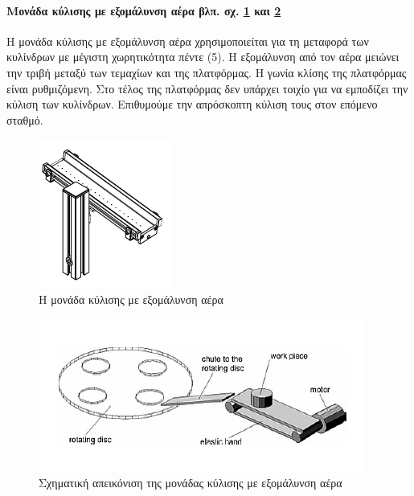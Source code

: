 \documentclass[a4paper,12pt,twoside]{report}
\begin{document}
{				\paragraph{Μονάδα κύλισης με εξομάλυνση αέρα {\footnotesize βλπ. σχ. \ref{φωτ:Η μονάδα κύλισης με εξομάλυνση αέρα από Festo} και \ref{φωτ:Σχηματική απεικόνιση της μονάδας κύλισης με εξομάλυνση αέρα από Θράμπο}}} {Η μονάδα κύλισης με εξομάλυνση αέρα χρησιμοποιείται για τη μεταφορά των κυλίνδρων με μέγιστη χωρητικότητα πέντε (5). Η εξομάλυνση από τον αέρα μειώνει την τριβή μεταξύ των τεμαχίων και της πλατφόρμας. Η γωνία κλίσης της πλατφόρμας είναι ρυθμιζόμενη. Στο τέλος της πλατφόρμας δεν υπάρχει τοιχίο για να εμποδίζει την κύλιση των κυλίνδρων. Επιθυμούμε την απρόσκοπτη κύλιση τους στον επόμενο σταθμό.
				}
				\begin{figure}[hp]
					\centering
					\includegraphics[scale=1]{TestingStationAirCushionedSlideModule.png}
					\caption{Η μονάδα κύλισης με εξομάλυνση αέρα \cite{FestoMPSTestingStationManual}}
					\label{φωτ:Η μονάδα κύλισης με εξομάλυνση αέρα από Festo}
				\end{figure}
				\begin{figure}[hp]
					\centering
					\includegraphics[scale=1]{TestingStationAirCushionedSlideTrambo.png}
					\caption{Σχηματική απεικόνιση της μονάδας κύλισης με εξομάλυνση αέρα \cite{ΤοΦυσικόΣύστημαFestoMPS}}
					\label{φωτ:Σχηματική απεικόνιση της μονάδας κύλισης με εξομάλυνση αέρα από Θράμπο}
				\end{figure}
				
}
\end{document}
